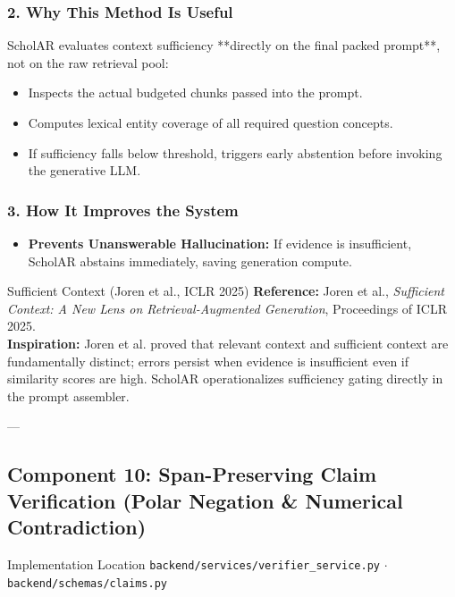 \documentclass[11pt,a4paper]{article}
\begin{document}
\subsubsection{2. Why This Method Is Useful}
ScholAR evaluates context sufficiency **directly on the final packed prompt**, not on the raw retrieval pool:
\begin{itemize}[leftmargin=*]
    \item Inspects the actual budgeted chunks passed into the prompt.
    \item Computes lexical entity coverage of all required question concepts.
    \item If sufficiency falls below threshold, triggers early abstention before invoking the generative LLM.
\end{itemize}

\subsubsection{3. How It Improves the System}
\begin{itemize}[leftmargin=*]
    \item \textbf{Prevents Unanswerable Hallucination:} If evidence is insufficient, ScholAR abstains immediately, saving generation compute.
\end{itemize}

\begin{inspirationbox}{Sufficient Context (Joren et al., ICLR 2025)}
\textbf{Reference:} Joren et al., \emph{Sufficient Context: A New Lens on Retrieval-Augmented Generation}, Proceedings of ICLR 2025.\\
\textbf{Inspiration:} Joren et al. proved that relevant context and sufficient context are fundamentally distinct; errors persist when evidence is insufficient even if similarity scores are high. ScholAR operationalizes sufficiency gating directly in the prompt assembler.
\end{inspirationbox}

---

\subsection{Component 10: Span-Preserving Claim Verification (Polar Negation \& Numerical Contradiction)}
\begin{codebox}{Implementation Location}
\texttt{backend/services/verifier\_service.py} $\cdot$ \texttt{backend/schemas/claims.py}
\end{codebox}
\end{document}
